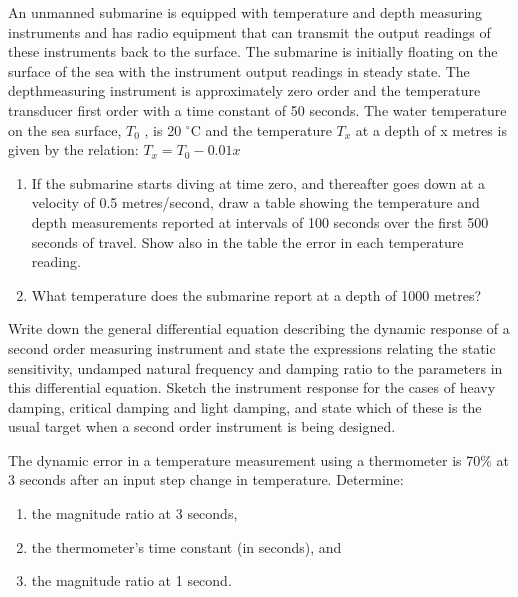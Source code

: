 \documentclass[a4paper,11pt]{book}
\begin{document}
\begin{question}[subtitle=Example on $1_{\rm st}$-order device]
An unmanned submarine is equipped with temperature and depth measuring instruments
and has radio equipment that can transmit the output readings of these instruments back to
the surface. The submarine is initially floating on the surface of the sea with the instrument
output readings in steady state. The depthmeasuring instrument is approximately zero order
and the temperature transducer first order with a time constant of 50 seconds. The water
temperature on the sea surface, $T_0$ , is 20 $^{\circ}$C and the temperature $T_x$ at a depth of x metres is
given by the relation:
$T_x = T_0 - 0.01x$

\begin{enumerate}
\item If the submarine starts diving at time zero, and thereafter goes down at a velocity of 0.5
metres/second, draw a table showing the temperature and depth measurements reported at
intervals of 100 seconds over the first 500 seconds of travel. Show also in the table the error
in each temperature reading.
\item  What temperature does the submarine report at a depth of 1000 metres?
\end{enumerate}

\examspace*{10em}

\end{question}
\begin{solution}


\end{solution}



\begin{question}
Write down the general differential equation describing the dynamic response of a second
order measuring instrument and state the expressions relating the static sensitivity, undamped
natural frequency and damping ratio to the parameters in this differential equation. Sketch
the instrument response for the cases of heavy damping, critical damping and light damping,
and state which of these is the usual target when a second order instrument is being designed.

\examspace*{40em}

\end{question}
\begin{solution}


\end{solution}


\begin{question}[subtitle=Midterm 2014]
The dynamic error in a temperature measurement using a thermometer is 70\% at 3 seconds
after an input step change in temperature. Determine:
\begin{enumerate}
\item the magnitude ratio at 3 seconds,
\item the thermometer’s time constant (in seconds), and
\item the magnitude ratio at 1 second.
\end{enumerate}
\end{question}
\begin{solution}
\end{solution}
\end{document}
